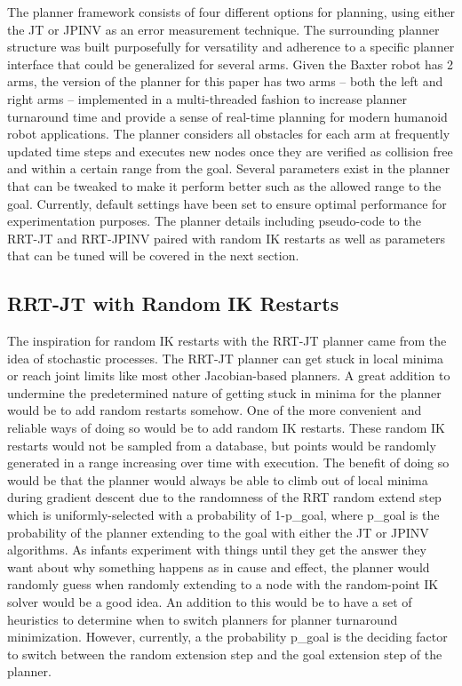 \documentclass[conference]{IEEEtran} \usepackage[T1]{fontenc} \usepackage[backend=biber, style=ieee]{biblatex}
\begin{document}
The planner framework consists of four different options for planning, using either the JT or JPINV as an error measurement technique. The surrounding planner structure was built
purposefully for versatility and adherence to a specific planner interface that could be generalized for several arms. Given the Baxter robot has 2 arms, the version of
the planner for this paper has two arms -- both the left and right arms -- implemented in a multi-threaded fashion to increase planner turnaround time and provide a 
sense of real-time planning for modern humanoid robot applications. The planner considers all obstacles for each arm at frequently updated time steps and executes new
nodes once they are verified as collision free and within a certain range from the goal. Several parameters exist in the planner that can be tweaked to make it
perform better such as the allowed range to the goal. Currently, default settings have been set to ensure optimal performance for experimentation purposes.
The planner details including pseudo-code to the RRT-JT and RRT-JPINV paired with random IK restarts as well as parameters that can be tuned will be covered in the 
next section.

\subsection{RRT-JT with Random IK Restarts}

The inspiration for random IK restarts with the RRT-JT planner came from the idea of stochastic processes. The RRT-JT planner can get stuck in local minima or reach joint
limits like most other Jacobian-based planners. A great addition to undermine the predetermined nature of getting stuck in minima for the planner would be to add random
restarts somehow. One of the more convenient and reliable ways of doing so would be to add random IK restarts. These random IK restarts would not be sampled from a database,
but points would be randomly generated in a range increasing over time with execution. The benefit of doing so would be that the planner would always be able to climb out of local
minima during gradient descent due to the randomness of the RRT random extend step which is uniformly-selected with a probability of 1-p_goal, where p_goal is the probability 
of the planner extending to the goal with either the JT or JPINV algorithms. As infants experiment with things until they get the answer they
want about why something happens as in cause and effect, the planner would randomly guess when randomly extending to a node with the random-point IK solver would be a good idea.
An addition to this would be to have a set of heuristics to determine when to switch planners for planner turnaround minimization. However, currently, a the probability
p_goal is the deciding factor to switch between the random extension step and the goal extension step of the planner.
\end{document}
